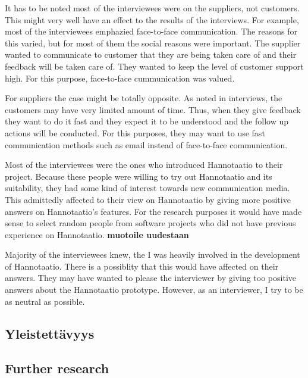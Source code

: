 \documentclass[english,12pt,a4paper,pdftex]{article}
\begin{document}
It has to be noted most of the interviewees were on the suppliers, not customers. This might very well have an effect to the results of the interviews. For example, most of the interviewees emphazied face-to-face communication. The reasons for this varied, but for most of them the social reasons were important. The supplier wanted to communicate to customer that they are being taken care of and their feedback will be taken care of. They wanted to keep the level of customer support high. For this purpose, face-to-face cummunication was valued. 

For suppliers the case might be totally opposite. As noted in interviews, the customers may have very limited amount of time. Thus, when they give feedback they want to do it fast and they expect it to be understood and the follow up actions will be conducted. For this purposes, they may want to use fast communication methods such as email instead of face-to-face communication.

Most of the interviewees were the ones who introduced Hannotaatio to their project. Because these people were willing to try out Hannotaatio and its suitability, they had some kind of interest towards new communication media. This admittedly affected to their view on Hannotaatio by giving more positive answers on Hannotaatio's features. For the research purposes it would have made sense to select random people from software projects who did not have previous experience on Hannotaatio. \textbf{muotoile uudestaan}

Majority of the interviewees knew, the I was heavily involved in the development of Hannotaatio. There is a possiblity that this would have affected on their answers. They may have wanted to please the interviewer by giving too positive answers about the Hannotaatio prototype. However, as an interviewer, I try to be as neutral as possible.

\subsection{Yleistettävyys}

\subsection{Further research}
\end{document}
